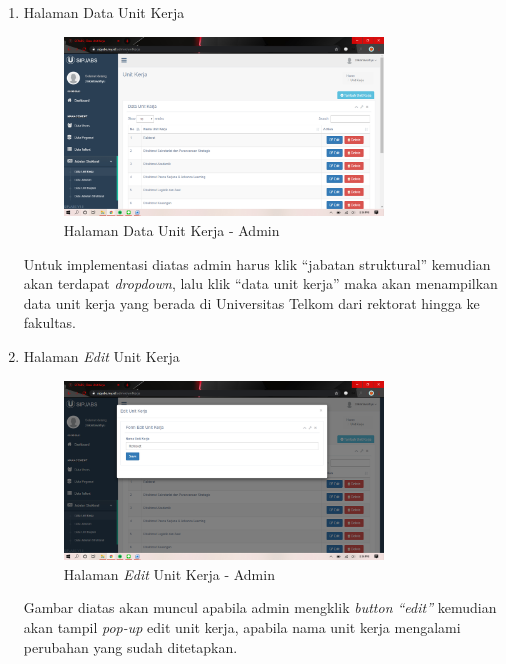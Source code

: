 \begin{enumerate}
	\newpage
	\item Halaman Data Unit Kerja
	\begin{figure}
		\centering
		\includegraphics[width=0.8\textwidth]
		{pics/admin/implementasi/dataunitkerja.png}
		\caption{Halaman Data Unit Kerja - Admin}
		\label{fig:CC10}
	\end{figure}
	Untuk implementasi diatas admin harus klik “jabatan struktural” kemudian akan terdapat \textit{dropdown}, lalu klik “data unit kerja” maka akan menampilkan data unit kerja yang berada di Universitas Telkom dari rektorat hingga ke fakultas. 
	
	\item Halaman \textit{Edit} Unit Kerja
	\begin{figure}
		\centering
		\includegraphics[width=0.8\textwidth]
		{pics/admin/implementasi/editunitkerja.png}
		\caption{Halaman \textit{Edit} Unit Kerja - Admin}
		\label{fig:CC10}
	\end{figure}
	Gambar diatas akan muncul apabila admin mengklik \textit{button “edit”} kemudian akan tampil \textit{pop-up} edit unit kerja, apabila nama unit kerja mengalami perubahan yang sudah ditetapkan. 
	

\end{enumerate}
